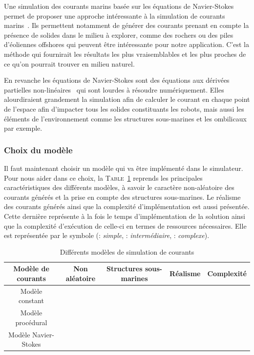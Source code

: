				Une simulation des courants marins basée sur les équations de Navier-Stokes permet de proposer une approche intéressante à la simulation de courants marins~\cite{Garau2006current}. Ils permettent notamment de générer des courants prenant en compte la présence de solides dans le milieu à explorer, comme des rochers ou des piles d'éoliennes offshores qui peuvent être intéressante pour notre application. C'est la méthode qui fournirait les résultats les plus vraisemblables et les plus proches de ce qu'on pourrait trouver en milieu naturel.

				En revanche les équations de Navier-Stokes sont des équations aux dérivées partielles non-linéaires~\cite{hinch2012hydrodynamique} qui sont lourdes à résoudre numériquement. Elles alourdiraient grandement la simulation afin de calculer le courant en chaque point de l'espace afin d'impacter tous les solides constituants les robots, mais aussi les éléments de l'environnement comme les structures sous-marines et les ombilicaux par exemple.

			\subsubsection{Choix du modèle}

				Il faut maintenant choisir un modèle qui va être implémenté dans le simulateur. Pour nous aider dans ce choix, la \textsc{Table}~\ref{table:courants} reprends les principales caractéristiques des différents modèles, à savoir le caractère non-aléatoire des courants générés et la prise en compte des structures sous-marines. Le réalisme des courants générés ainsi que la complexité d'implémentation est aussi présentée. Cette dernière représente à la fois le temps d'implémentation de la solution ainsi que la complexité d'exécution de celle-ci en termes de ressources nécessaires. Elle est représentée par le symbole \pmark (\pmark : \textit{simple}, \pmark \pmark : \textit{intermédiaire}, \pmark \pmark \pmark : \textit{complexe}).

				\begin{table}[ht]
					\centering
					\begin{adjustbox}{max width=\textwidth}
						\begin{tabular}{|c|c|c|c|c|}
							\hline
							\textbf{Modèle de courants} & \textbf{Non aléatoire} & \textbf{Structures sous-marines} & \textbf{Réalisme} & \textbf{Complexité} \\
							\hline
							Modèle constant & \cmark & \xmark & \pmark \pmark & \pmark\\
							\hline
							Modèle procédural & \xmark & \xmark & \pmark & \pmark \pmark \\
							\hline
							Modèle Navier-Stokes & \cmark & \cmark & \pmark \pmark \pmark & \pmark \pmark \pmark \\
							\hline
						\end{tabular}
					\end{adjustbox}
					\caption{Différents modèles de simulation de courants}
					\label{table:courants}
				\end{table}


